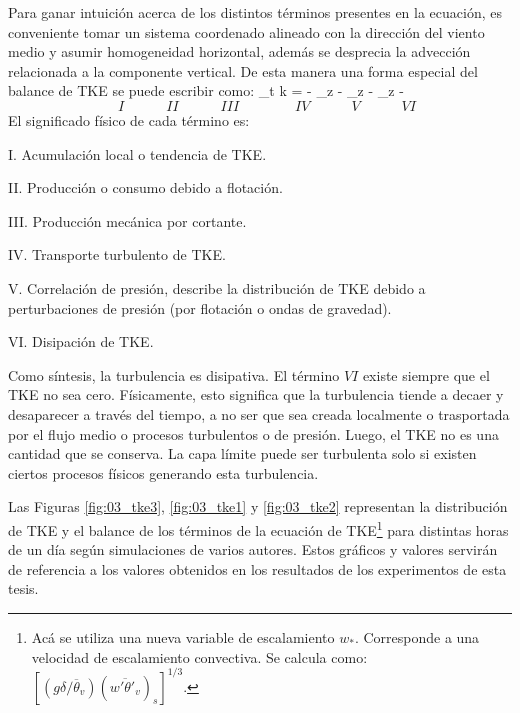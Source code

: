 Para ganar intuición acerca de los distintos términos presentes en la ecuación, es conveniente tomar un sistema coordenado alineado con la dirección del viento medio y asumir homogeneidad horizontal, además se desprecia la advección relacionada a la componente vertical. De esta manera una forma especial del balance de TKE se puede escribir como:
\be
\partial_t k  =  -  \partial_z  - \partial_z -  \partial_z  - \varepsilon
\ee
\vspace{-7mm}
\begin{equation*}
\quad I \quad\qquad II\quad\qquad III\qquad\qquad IV\quad\qquad V\quad\qquad VI
\end{equation*}
El significado físico de cada término es:
\begin{enumerate*}
	\item[I.] Acumulación local o tendencia de TKE.
	\item[II.] Producción o consumo debido a flotación.
	\item[III.] Producción mecánica por cortante.
	\item[IV.] Transporte turbulento de TKE.
	\item[V.] Correlación de presión, describe la distribución de TKE debido a perturbaciones de presión (por flotación o ondas de gravedad).
	\item[VI.] Disipación de TKE.
\end{enumerate*}

Como síntesis, la turbulencia es disipativa. El término $VI$ existe siempre que el TKE no sea cero. Físicamente, esto significa que la turbulencia tiende a decaer y desaparecer a través del tiempo, a no ser que sea creada localmente o trasportada por el flujo medio o procesos turbulentos o de presión. Luego, el TKE no es una cantidad que se conserva. La capa límite puede ser turbulenta solo si existen ciertos procesos físicos generando esta turbulencia.

Las Figuras \ref{fig:03_tke3}, \ref{fig:03_tke1} y \ref{fig:03_tke2} \cite{stull1988introduction} representan la distribución de TKE y el balance de los términos de la ecuación de TKE\footnote{Acá se utiliza una nueva variable de escalamiento $w_*$. Corresponde a una velocidad de escalamiento convectiva. Se calcula como: $[(g\delta/\overline{\theta}_v)(\overline{w'\theta'_v})_s]^{1/3}$.} para distintas horas de un día según simulaciones de varios autores. Estos gráficos y valores servirán de referencia a los valores obtenidos en los resultados de los experimentos de esta tesis.

